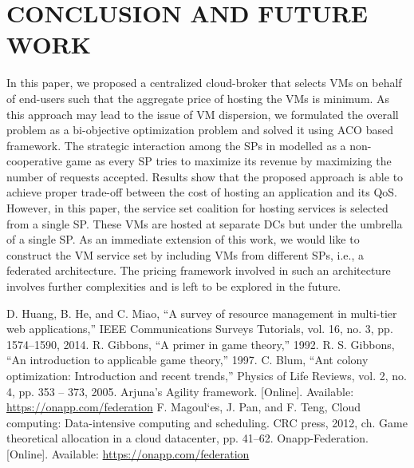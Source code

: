 \documentclass[conference]{IEEEtran}
\newcommand\tab[1][0.8cm]{\hspace*{#1}}
\begin{document}
\section{CONCLUSION AND FUTURE WORK}
\tab In this paper, we proposed a centralized cloud-broker that
selects VMs on behalf of end-users such that the aggregate
price of hosting the VMs is minimum. As this approach may
lead to the issue of VM dispersion, we formulated the overall
problem as a bi-objective optimization problem and solved it
using ACO based framework. The strategic interaction among
the SPs in modelled as a non-cooperative game as every SP
tries to maximize its revenue by maximizing the number of
requests accepted. Results show that the proposed approach is
able to achieve proper trade-off between the cost of hosting
an application and its QoS. However, in this paper, the service
set coalition for hosting services is selected from a single SP.
These VMs are hosted at separate DCs but under the umbrella
of a single SP. As an immediate extension of this work, we
would like to construct the VM service set by including VMs
from different SPs, i.e., a federated architecture. The pricing
framework involved in such an architecture involves further
complexities and is left to be explored in the future.



\begin{thebibliography}{00}
 D. Huang, B. He, and C. Miao, “A survey of resource management in
multi-tier web applications,” IEEE Communications Surveys Tutorials,
vol. 16, no. 3, pp. 1574–1590, 2014.
\newline
{} R. Gibbons, “A primer in game theory,” 1992.\newline
{} R. S. Gibbons, “An introduction to applicable game theory,” 1997.\newline
{} C. Blum, “Ant colony optimization: Introduction and recent trends,”
Physics of Life Reviews, vol. 2, no. 4, pp. 353 – 373, 2005.
\newline
{}  Arjuna’s Agility framework. [Online]. Available:
\href{https://onapp.com/federation}{https://onapp.com/federation}
\newline
{} F. Magoul`es, J. Pan, and F. Teng, Cloud computing: Data-intensive
computing and scheduling. CRC press, 2012, ch. Game theoretical
allocation in a cloud datacenter, pp. 41–62.
\newline
{}Onapp-Federation. [Online]. Available: \url{https://onapp.com/federation}
\end{thebibliography}
\end{document}
